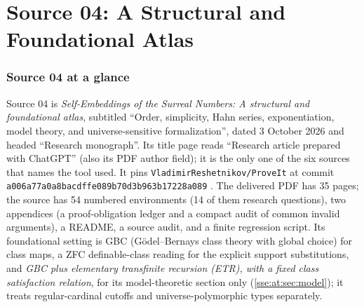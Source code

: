 \documentclass[11pt,a4paper]{article}
\numberwithin{equation}{section}
\theoremstyle{plain}
\theoremstyle{definition}
\theoremstyle{remark}
\newcommand{\code}[1]{\texttt{\small #1}}
\begin{document}
\part{Source 04: A Structural and Foundational Atlas}\label{sse:part:at}

\section{Source 04 at a glance}\label{sse:at:sec:glance}

Source 04 is \emph{Self-Embeddings of the Surreal Numbers: A structural and
foundational atlas}, subtitled ``Order, simplicity, Hahn series,
exponentiation, model theory, and universe-sensitive formalization'', dated
3 October 2026 and headed ``Research monograph''. Its title page reads
``Research article prepared with ChatGPT'' (also its PDF author field); it
is the only one of the six sources that names the tool used. It pins
\code{VladimirReshetnikov/ProveIt} at commit
\code{a006a77a0a8bacdffe089b70d3b963b17228a089} \cite{at-Repo}. The delivered
PDF has 35 pages; the source has 54 numbered environments (14 of them
research questions), two appendices (a proof-obligation ledger and a
compact audit of common invalid arguments), a README, a source audit, and
a finite regression script. Its foundational setting is GBC (G\"odel--Bernays
class theory with global choice) for class maps, a ZFC definable-class
reading for the explicit support substitutions, and \emph{GBC plus
elementary transfinite recursion (ETR), with a fixed class satisfaction
relation}, for its model-theoretic section only
(\cref{sse:at:sec:model}); it treats regular-cardinal cutoffs and
universe-polymorphic types separately.
\end{document}
